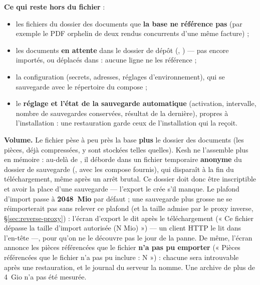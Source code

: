 \documentclass[a4paper,11pt,oneside]{article}
\begin{document}
\textbf{Ce qui reste hors du fichier} :
\begin{itemize}
    \item les fichiers du dossier des documents que \textbf{la base ne référence pas} (par exemple le PDF orphelin de deux rendus concurrents d'une même facture) ;
    \item les documents \textbf{en attente} dans le dossier de dépôt (, ) --- pas encore importés, ou déplacés dans  : aucune ligne ne les référence ;
    \item la configuration  (secrets, adresses, réglages d'environnement), qui se sauvegarde avec le répertoire du compose ;
    \item le \textbf{réglage et l'état de la sauvegarde automatique} (activation, intervalle, nombre de sauvegardes conservées, résultat de la dernière), propres à l'installation : une restauration garde ceux de l'installation qui la reçoit.
\end{itemize}

\textbf{Volume.} Le fichier pèse à peu près la base \textbf{plus} le dossier des documents (les pièces, déjà compressées, y sont stockées telles quelles). Kesh ne l'assemble plus en mémoire : au-delà de , il déborde dans un fichier temporaire \textbf{anonyme} du dossier de sauvegarde (,  avec les compose fournis), qui disparaît à la fin du téléchargement, même après un arrêt brutal. Ce dossier doit donc être inscriptible et avoir la place d'une sauvegarde --- l'export le crée s'il manque. Le plafond d'import  passe à \textbf{2048~Mio} par défaut ; une sauvegarde plus grosse ne se réimporterait pas sans relever ce plafond (et la taille admise par le proxy inverse, \S\ref{sec:reverse-proxy}) : l'écran d'export le dit après le téléchargement (« Ce fichier dépasse la taille d'import autorisée (N Mio) ») --- un client HTTP le lit dans l'en-tête  ---, pour qu'on ne le découvre pas le jour de la panne. De même, l'écran annonce les pièces référencées que le fichier \textbf{n'a pas pu emporter} (« Pièces référencées que le fichier n'a pas pu inclure : N ») : chacune sera introuvable après une restauration, et le journal du serveur la nomme. Une archive de plus de 4~Gio n'a pas été mesurée.
\end{document}
